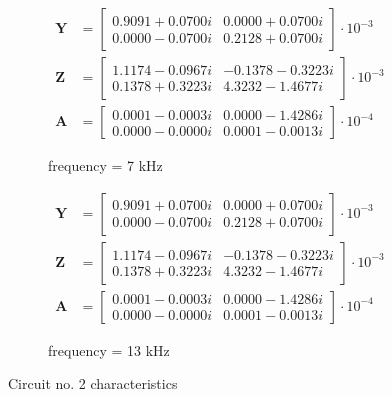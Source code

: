 \documentclass[notitlepage, a4paper, 11pt]{article}
\begin{document}
	\begin{figure}[H]
		\begin{subfigure}{0.45\textwidth}
				\begin{align*}
				\mathbf{Y} &= 
				\begin{bmatrix}
					0.9091 + 0.0700i  & 0.0000 + 0.0700i \\
					0.0000 - 0.0700i  & 0.2128 + 0.0700i
				\end{bmatrix}
				\cdot 10^{-3}
				\\
				\mathbf{Z} &= 
				\begin{bmatrix}
					1.1174 - 0.0967i & -0.1378 - 0.3223i \\
					0.1378 + 0.3223i & 4.3232 - 1.4677i
				\end{bmatrix}
				\cdot 10^{-3}
				\\
				\mathbf{A} &= 
				\begin{bmatrix}
					0.0001 - 0.0003i & 0.0000 - 1.4286i \\
					0.0000 - 0.0000i & 0.0001 - 0.0013i
				\end{bmatrix}
				\cdot 10^{-4}
			\end{align*}
			\caption{frequency = 7 kHz}
		\end{subfigure}
		\hfill
		\begin{subfigure}{0.45\textwidth}
			\begin{align*}
				\mathbf{Y} &= 
				\begin{bmatrix}
					0.9091 + 0.0700i  & 0.0000 + 0.0700i \\
					0.0000 - 0.0700i  & 0.2128 + 0.0700i
				\end{bmatrix}
				\cdot 10^{-3}
				\\
				\mathbf{Z} &= 
				\begin{bmatrix}
					1.1174 - 0.0967i & -0.1378 - 0.3223i \\
					0.1378 + 0.3223i & 4.3232 - 1.4677i
				\end{bmatrix}
				\cdot 10^{-3}
				\\
				\mathbf{A} &= 
				\begin{bmatrix}
					0.0001 - 0.0003i & 0.0000 - 1.4286i \\
					0.0000 - 0.0000i & 0.0001 - 0.0013i
				\end{bmatrix}
				\cdot 10^{-4}
			\end{align*}
			\caption{frequency = 13 kHz}
		\end{subfigure}
		\caption{Circuit no. 2 characteristics}
	\end{figure}
\end{document}
